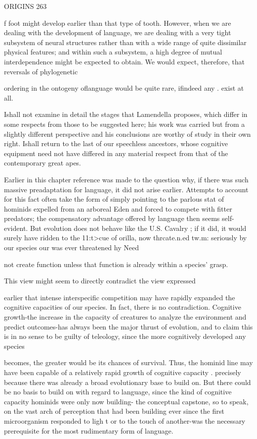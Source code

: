 ORIGINS 263

f foot might develop earlier than that type of tooth. However, when we are dealing with the development of language, we are dealing with a very tight subsystem of neural structures rather than with a wide range of quite dissimilar physical features; and within such a sub\-system, a high degree of mutual interdependence might be expected to obtain. We would expect, therefore, that reversals of phylogenetic

ordering in the ontogeny oflanguage would be quite rare, ifindeed any . exist at all.

Ishall not examine in detail the stages that Lamendella proposes, which differ in some respects from those to be suggested here; his work was carried but from a slightly different perspective and his conclusions are worthy of study in their own right. Ishall return to the last of our speechless ancestors, whose cognitive equipment need not have differed in any material respect from that of the contemporary great apes.

Earlier in this chapter reference was made to the question why, if there was such massive preadaptation for language, it did not arise earlier. Attempts to account for this fact often take the form of simply pointing to the parlous stat of hominids expelled from an arboreal Eden and forced to compete with fitter predators; the compensatory advantage offered by language then seems self-evident. But evolution does not behave like the U.S. Cavalry ; if it did, it would surely have ridden to the 11:t{\textgreater}cue of orilla, now thrcate.n.ed tw.m: seriously by our species our was ever threatened hy Need

not create function unless that function is already within a species' grasp.

This view might seem to directly contradict the view expressed

earlier that intense interspecific competition may have rapidly ex\-panded the cognitive capacities of our species. In fact, there is no contradiction. Cognitive growth-the increase in the capacity of crea\-tures to analyze the environment and predict outcomes-has always been the major thrust of evolution, and to claim this is in no sense to be guilty of teleology, since the more cognitively developed any species


becomes, the greater would be its chances of survival. Thus, the homi\-nid line may have been capable of a relatively rapid growth of cognitive capacity . precisely because there was already a broad evolutionary base to build on. But there could be no basis to build on with regard to language, since the kind of cognitive capacity hominids were only now building- the conceptual capstone, so to speak, on the vast arch of perception that had been building ever since the first microorganism responded to ligh t or to the touch of another-was the necessary prerequisite for the most rudimentary form of language.

